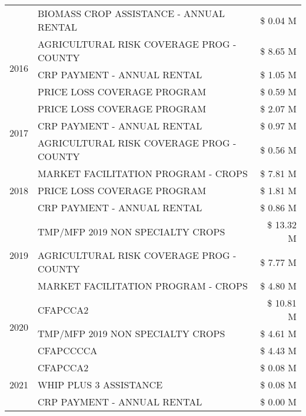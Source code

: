 \begin{tabular}{llr}
 & BIOMASS CROP ASSISTANCE - ANNUAL RENTAL & \$ 0.04 M \\
\cline{1-3}
\multirow[t]{3}{*}{2016} & AGRICULTURAL RISK COVERAGE PROG - COUNTY & \$ 8.65 M \\
 & CRP PAYMENT - ANNUAL RENTAL & \$ 1.05 M \\
 & PRICE LOSS COVERAGE PROGRAM & \$ 0.59 M \\
\cline{1-3}
\multirow[t]{3}{*}{2017} & PRICE LOSS COVERAGE PROGRAM & \$ 2.07 M \\
 & CRP PAYMENT - ANNUAL RENTAL & \$ 0.97 M \\
 & AGRICULTURAL RISK COVERAGE PROG - COUNTY & \$ 0.56 M \\
\cline{1-3}
\multirow[t]{3}{*}{2018} & MARKET FACILITATION PROGRAM - CROPS & \$ 7.81 M \\
 & PRICE LOSS COVERAGE PROGRAM & \$ 1.81 M \\
 & CRP PAYMENT - ANNUAL RENTAL & \$ 0.86 M \\
\cline{1-3}
\multirow[t]{3}{*}{2019} & TMP/MFP 2019 NON SPECIALTY CROPS & \$ 13.32 M \\
 & AGRICULTURAL RISK COVERAGE PROG - COUNTY & \$ 7.77 M \\
 & MARKET FACILITATION PROGRAM - CROPS & \$ 4.80 M \\
\cline{1-3}
\multirow[t]{3}{*}{2020} & CFAPCCA2 & \$ 10.81 M \\
 & TMP/MFP 2019 NON SPECIALTY CROPS & \$ 4.61 M \\
 & CFAPCCCCA & \$ 4.43 M \\
\cline{1-3}
\multirow[t]{3}{*}{2021} & CFAPCCA2 & \$ 0.08 M \\
 & WHIP PLUS 3 ASSISTANCE & \$ 0.08 M \\
 & CRP PAYMENT - ANNUAL RENTAL & \$ 0.00 M \\
\cline{1-3}
\bottomrule
\end{tabular}
